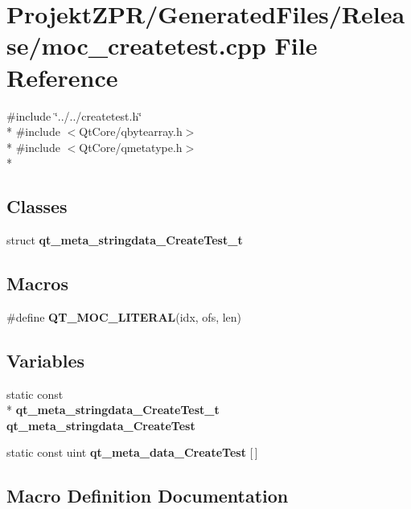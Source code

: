 \section{Projekt\-Z\-P\-R/\-Generated\-Files/\-Release/moc\-\_\-createtest.cpp File Reference}
\label{_release_2moc__createtest_8cpp}
{\ttfamily \#include \char`\"{}../../createtest.\-h\char`\"{}}\\*
{\ttfamily \#include $<$Qt\-Core/qbytearray.\-h$>$}\\*
{\ttfamily \#include $<$Qt\-Core/qmetatype.\-h$>$}\\*
\subsection*{Classes}
\begin{DoxyCompactItemize}
\item 
struct {\bf qt\-\_\-meta\-\_\-stringdata\-\_\-\-Create\-Test\-\_\-t}
\end{DoxyCompactItemize}
\subsection*{Macros}
\begin{DoxyCompactItemize}
\item 
\#define {\bf Q\-T\-\_\-\-M\-O\-C\-\_\-\-L\-I\-T\-E\-R\-A\-L}(idx, ofs, len)
\end{DoxyCompactItemize}
\subsection*{Variables}
\begin{DoxyCompactItemize}
\item 
static const \\*
{\bf qt\-\_\-meta\-\_\-stringdata\-\_\-\-Create\-Test\-\_\-t} {\bf qt\-\_\-meta\-\_\-stringdata\-\_\-\-Create\-Test}
\item 
static const uint {\bf qt\-\_\-meta\-\_\-data\-\_\-\-Create\-Test} [$\,$]
\end{DoxyCompactItemize}


\subsection{Macro Definition Documentation}
